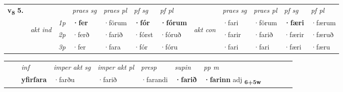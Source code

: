 \begin{tabular}{llllllllllll} \toprule
\multirow{4}{*}{{{\textbf{v{\textsubscript{8}}} \Large{\textbf{5.}}}}}  & &   &  \textit{praes sg}  & \textit{praes pl}  &\textit{ pf sg} & \textit{pf pl} &  &  \textit{praes sg}  & \textit{praes pl}  & \textit{pf sg} & \textit{pf pl } \\*
	\cmidrule{4-7} \cmidrule{9-12}
 & \multirow{3}{*}{\begin{turn}{90}\textit{akt ind}\end{turn}} & {\textit{1p}} & \textbf{·fer} & ·förum    & \textbf{·fór} & \textbf{·fórum} & \multirow{3}{*}{\begin{turn}{90}\textit{akt con}\end{turn}} &·fari & ·förum & \textbf{·færi} & ·færum\\*
& &  {\textit{2p}} &  ·ferð  & ·farið   & ·fórst & ·fóruð & & ·farir & ·farið & ·færir & ·færuð \\*
& &  {\textit{3p}} & ·fer & ·fara   & ·fór & ·fóru & & ·fari & ·fari& ·færi & ·færu  \\*
\cmidrule{4-7} \cmidrule{9-12}
\end{tabular}


\begin{tabular}{llllllllllll}
 & & \textit{inf} & \textit{imper akt sg} & \textit{imper akt pl}   & \textit{presp} & \textit{supin}  & \textit{pp m}     \\*
  & & \textbf{yfirfara} & ·farðu  & ·farið   & ·farandi &  \textbf{·farið}  & \textbf{·farinn} adj \textbf{\textsubscript{6+5w}} \\*
\cmidrule{1-12}
\end{tabular}



